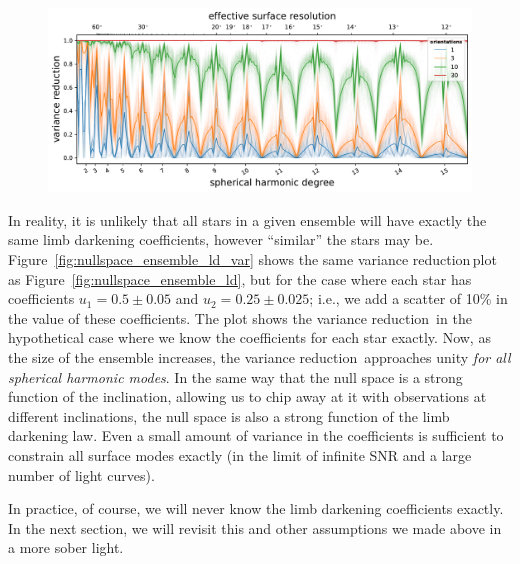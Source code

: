 \documentclass[modern]{aastex62}
\newcommand{\shrinkage}{{variance reduction\,}}
\begin{document}
\begin{figure}[t!]
    \begin{centering}
        \includegraphics[width=\linewidth]{figures/nullspace_ensemble_ld_var.pdf}
    \end{centering}
\end{figure}

In reality, it is unlikely that all stars in a given ensemble will have exactly
the same limb darkening coefficients, however ``similar'' the stars may be.
Figure~\ref{fig:nullspace_ensemble_ld_var} shows the same
\shrinkage plot as Figure~\ref{fig:nullspace_ensemble_ld},
but for the case where each star has coefficients
$u_1 = 0.5 \pm 0.05$ and $u_2 = 0.25 \pm 0.025$; i.e., we add a scatter of
10\% in the value of these coefficients. The plot shows the \shrinkage
in the hypothetical case where we know the coefficients for
each star exactly. Now, as the size of the ensemble increases, the \shrinkage
approaches unity \emph{for all spherical harmonic modes}.
In the same way that the null space is a strong function of the inclination,
allowing us to chip away at it with observations at different inclinations,
the null space is also a strong function of the limb darkening law. Even a
small amount of variance in the coefficients is sufficient to constrain all surface
modes exactly (in the limit of infinite SNR and a large number of light curves).

In practice, of course, we will never know the limb darkening coefficients
exactly. In the next section, we will revisit this and other assumptions we
made above in a more sober light.
\end{document}
